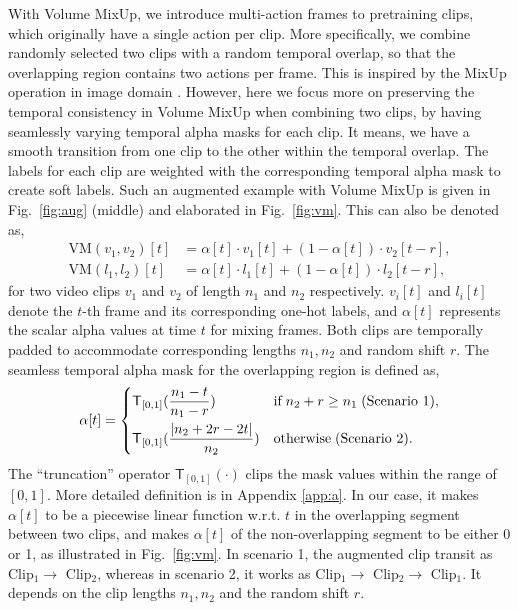 \documentclass[10pt,twocolumn,letterpaper]{article}
\newcommand{\fref}[1]{Fig.~\ref{#1}}
\begin{document}
With Volume MixUp, we introduce multi-action frames to pretraining clips, which originally have a single action per clip. More specifically, we combine randomly selected two clips with a random temporal overlap, so that the overlapping region contains two actions per frame. This is inspired by the MixUp operation in image domain \cite{zhang2017mixup}. However, here we focus more on preserving the temporal consistency in Volume MixUp when combining two clips, by having seamlessly varying temporal alpha masks for each clip. It means, we have a smooth transition from one clip to the other within the temporal overlap. The labels for each clip are weighted with the corresponding temporal alpha mask to create soft labels. Such an augmented example with Volume MixUp is given in \fref{fig:aug} (middle) and elaborated in \fref{fig:vm}. This can also be denoted as,
{\small
	\begin{align*}
		\text{VM}(v_1,v_2)[t] &= \alpha[t] \cdot v_1[t] + (1-\alpha[t]) \cdot v_2[t-r],\\
		\text{VM}(l_1,l_2)[t] &= \alpha[t] \cdot l_1[t] + (1-\alpha[t]) \cdot l_2[t-r],
	\end{align*}
}%
for two video clips $v_1$ and $v_2$ of length $n_1$ and $n_2$ respectively. $v_i[t]$ and $l_i[t]$ denote the $t$-th frame and its corresponding one-hot labels, and $\alpha[t]$ represents the scalar alpha values at time $t$ for mixing frames. Both clips are temporally padded to accommodate corresponding lengths $n_1, n_2$ and random shift $r$. The seamless temporal alpha mask for the overlapping region is defined as,
{\small
	\begin{equation*}
		\label{eq:alpha}
		\alpha[t]=
		\begin{dcases}
			\mathsf{T}_{[0,1]}(\frac{n_1-t}{n_1-r}) &\text{if}\; n_2+r\geq n_1\; \text{(Scenario 1),}\\
			\mathsf{T}_{[0,1]}(\frac{|n_2+2r-2t|}{n_2}) & \text{otherwise}\; \text{(Scenario 2).}\\
		\end{dcases}  
	\end{equation*}
}%
The ``truncation'' operator $\mathsf{T}_{[0,1]}(\cdot)$ clips the mask values within the range of $[0,1]$. More detailed definition is in Appendix \ref{app:a}. In our case, it makes $\alpha[t]$ to be a piecewise linear function w.r.t. $t$ in the overlapping segment between two clips, and makes $\alpha[t]$ of the non-overlapping segment to be either 0 or 1, as illustrated in \fref{fig:vm}. 
In scenario 1, the augmented clip transit as Clip$_1 \rightarrow$ Clip$_2$, whereas in scenario 2, it works as Clip$_1 \rightarrow$ Clip$_2 \rightarrow$ Clip$_1$. It depends on the clip lengths $n_1, n_2$ and the random shift $r$.
\end{document}
